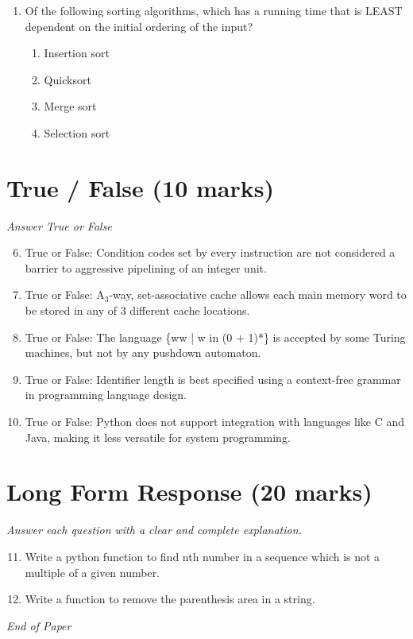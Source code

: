 \documentclass[12pt]{article}
\begin{document}
\begin{enumerate}[label=\arabic*.]
\begin{enumerate}[label=(\alph*)]
    \item Finding a shortest cycle in G
    \item Finding ALL spanning trees of G
    \item Finding a largest clique in G
\end{enumerate}
\item Of the following sorting algorithms, which has a running time that is LEAST dependent on the initial ordering of the input?
\begin{enumerate}[label=(\alph*)]
    \item Insertion sort
    \item Quicksort
    \item Merge sort
    \item Selection sort
\end{enumerate}
\end{enumerate}

\section*{True / False (10 marks)}
\textit{Answer True or False}
\begin{enumerate}[label=\arabic*.]
\setcounter{enumi}{5}
\item True or False: Condition codes set by every instruction are not considered a barrier to aggressive pipelining of an integer unit.
\item True or False: A$_{3}$-way, set-associative cache allows each main memory word to be stored in any of 3 different cache locations.
\item True or False: The language \{ww | w in (0 + 1)*\} is accepted by some Turing machines, but not by any pushdown automaton.
\item True or False: Identifier length is best specified using a context-free grammar in programming language design.
\item True or False: Python does not support integration with languages like C and Java, making it less versatile for system programming.
\end{enumerate}

\section*{Long Form Response (20 marks)}
\textit{Answer each question with a clear and complete explanation.}
\begin{enumerate}[label=\arabic*.]
\setcounter{enumi}{10}
\item Write a python function to find nth number in a sequence which is not a multiple of a given number.
\item Write a function to remove the parenthesis area in a string.
\end{enumerate}

\vfill
\noindent\textit{End of Paper}
\end{document}
